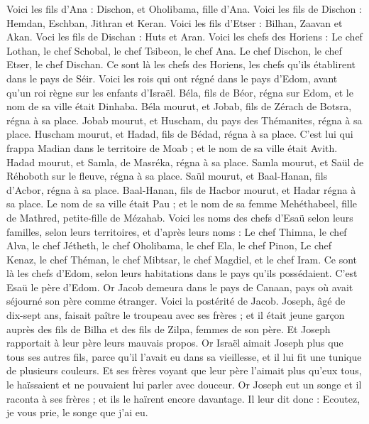 \begin{multicols}{2}
Voici les fils d'Ana : Dischon, et Oholibama, fille d'Ana.
Voici les fils de Dischon : Hemdan, Eschban, Jithran et Keran.
Voici les fils d'Etser : Bilhan, Zaavan et Akan.
Voci les fils de Dischan : Huts et Aran.
Voici les chefs des Horiens : Le chef Lothan, le chef Schobal, le chef Tsibeon, le chef Ana.
Le chef Dischon, le chef Etser, le chef Dischan. Ce sont là les chefs des Horiens, les chefs qu'ils établirent dans le pays de Séir.
Voici les rois qui ont régné dans le pays d'Edom, avant qu'un roi règne sur les enfants d'Israël.
Béla, fils de Béor, régna sur Edom, et le nom de sa ville était Dinhaba.
Béla mourut, et Jobab, fils de Zérach de Botsra, régna à sa place.
Jobab mourut, et Huscham, du pays des Thémanites, régna à sa place.
Huscham mourut, et Hadad, fils de Bédad, régna à sa place. C'est lui qui frappa Madian dans le territoire de Moab ; et le nom de sa ville était Avith.
Hadad mourut, et Samla, de Masréka, régna à sa place.
Samla mourut, et Saül de Réhoboth sur le fleuve, régna à sa place.
Saül mourut, et Baal-Hanan, fils d'Acbor, régna à sa place.
Baal-Hanan, fils de Hacbor mourut, et Hadar régna à sa place. Le nom de sa ville était Pau ; et le nom de sa femme Mehéthabeel, fille de Mathred, petite-fille de Mézahab.
Voici les noms des chefs d'Esaü selon leurs familles, selon leurs territoires, et d'après leurs noms : Le chef Thimna, le chef Alva, le chef Jétheth,
le chef Oholibama, le chef Ela, le chef Pinon,
Le chef Kenaz, le chef Théman, le chef Mibtsar,
le chef Magdiel, et le chef Iram. Ce sont là les chefs d'Edom, selon leurs habitations dans le pays qu'ils possédaient. C'est Esaü le père d'Edom.
\VerseOne{}Or Jacob demeura dans le pays de Canaan, pays où avait séjourné son père comme étranger.
Voici la postérité de Jacob. Joseph, âgé de dix-sept ans, faisait paître le troupeau avec ses frères ; et il était jeune garçon auprès des fils de Bilha et des fils de Zilpa, femmes de son père. Et Joseph rapportait à leur père leurs mauvais propos.
Or Israël aimait Joseph plus que tous ses autres fils, parce qu'il l'avait eu dans sa vieillesse, et il lui fit une tunique de plusieurs couleurs.
Et ses frères voyant que leur père l'aimait plus qu'eux tous, le haïssaient et ne pouvaient lui parler avec douceur.
Or Joseph eut un songe et il raconta à ses frères ; et ils le haïrent encore davantage.
Il leur dit donc : Ecoutez, je vous prie, le songe que j'ai eu.

\end{multicols}
